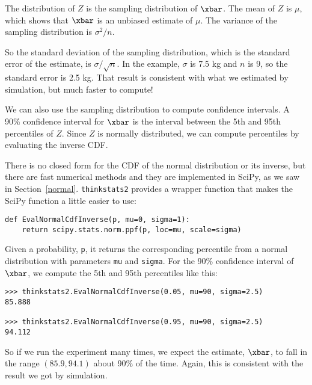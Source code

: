 The distribution of $Z$ is the sampling distribution of $\xbar$.
The mean of $Z$ is $\mu$, which shows that $\xbar$ is an unbiased
estimate of $\mu$.  The variance of the sampling distribution
is $\sigma^2 / n$.

So the standard deviation of the sampling distribution, which is the
standard error of the estimate, is $\sigma / \sqrt{n}$.  In the
example, $\sigma$ is 7.5 kg and $n$ is 9, so the standard error is 2.5
kg.  That result is consistent with what we estimated by simulation,
but much faster to compute!

We can also use the sampling distribution to compute confidence
intervals.  A 90\% confidence interval for $\xbar$ is the interval
between the 5th and 95th percentiles of $Z$.  Since $Z$ is normally
distributed, we can compute percentiles by evaluating the inverse
CDF.

There is no closed form for the CDF of the normal distribution
or its inverse, but there are fast numerical methods and they
are implemented in SciPy, as we saw in Section~\ref{normal}.
{\tt thinkstats2} provides a wrapper function that makes the
SciPy function a little easier to use:

\begin{verbatim}
def EvalNormalCdfInverse(p, mu=0, sigma=1):
    return scipy.stats.norm.ppf(p, loc=mu, scale=sigma)
\end{verbatim}

Given a probability, {\tt p}, it returns the corresponding
percentile from a normal distribution with parameters {\tt mu}
and {\tt sigma}.  For the 90\% confidence interval of $\xbar$,
we compute the 5th and 95th percentiles like this:

\begin{verbatim}
>>> thinkstats2.EvalNormalCdfInverse(0.05, mu=90, sigma=2.5)
85.888

>>> thinkstats2.EvalNormalCdfInverse(0.95, mu=90, sigma=2.5)
94.112
\end{verbatim}

So if we run the experiment many times, we expect the
estimate, $\xbar$, to fall in the range $(85.9, 94.1)$ about
90\% of the time.  Again, this is consistent with the result
we got by simulation.


